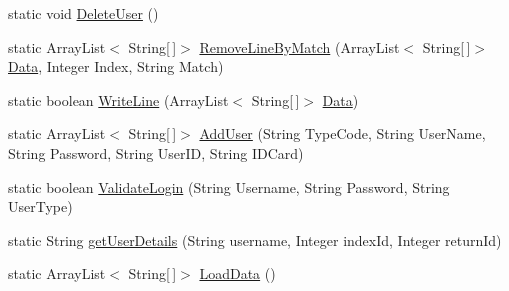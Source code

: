 \begin{DoxyCompactItemize}
\item 
static void \mbox{\hyperlink{classjsonbasedvoting_1_1_json_based_voting_ac203bbbbb46504b4239c28d595e1cdfc}{Delete\+User}} ()
\item 
static Array\+List$<$ String\mbox{[}$\,$\mbox{]}$>$ \mbox{\hyperlink{classjsonbasedvoting_1_1_json_based_voting_a6710604aec057cdca50e794f8f3faaee}{Remove\+Line\+By\+Match}} (Array\+List$<$ String\mbox{[}$\,$\mbox{]}$>$ \mbox{\hyperlink{classjsonbasedvoting_1_1_json_based_voting_a2450ce5604c5512836d2739373c6245e}{Data}}, Integer Index, String Match)
\item 
static boolean \mbox{\hyperlink{classjsonbasedvoting_1_1_json_based_voting_a279df688d1148c7b6c9a60477ac5c268}{Write\+Line}} (Array\+List$<$ String\mbox{[}$\,$\mbox{]}$>$ \mbox{\hyperlink{classjsonbasedvoting_1_1_json_based_voting_a2450ce5604c5512836d2739373c6245e}{Data}})
\item 
static Array\+List$<$ String\mbox{[}$\,$\mbox{]}$>$ \mbox{\hyperlink{classjsonbasedvoting_1_1_json_based_voting_a2812b6974dc14e6068d01736d81c41c3}{Add\+User}} (String Type\+Code, String User\+Name, String Password, String User\+ID, String I\+D\+Card)
\item 
static boolean \mbox{\hyperlink{classjsonbasedvoting_1_1_json_based_voting_a894522ca8e7dce00b4b55f8db6b102fe}{Validate\+Login}} (String Username, String Password, String User\+Type)
\item 
static String \mbox{\hyperlink{classjsonbasedvoting_1_1_json_based_voting_a680b57ed482d3bb4b0427d7219712823}{get\+User\+Details}} (String username, Integer index\+Id, Integer return\+Id)
\item 
static Array\+List$<$ String\mbox{[}$\,$\mbox{]}$>$ \mbox{\hyperlink{classjsonbasedvoting_1_1_json_based_voting_adbcb2c2a084932df90996c7199251579}{Load\+Data}} ()
\end{DoxyCompactItemize}
